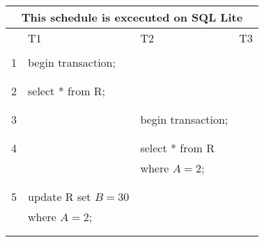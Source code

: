 \documentclass[addpoints,answers,12pt]{exam}
\begin{document}
\begin{questions}
\begin{parts}
\begin{subparts}
\hspace{-3cm}
\begin{tabular}{|c|l|l|l|} \hline
 \multicolumn{4}{|c|}{This schedule is excecuted on {\bf SQL Lite}} \\ \hline
   & \parbox{0.32\textwidth}{T1} & \parbox{0.32\textwidth}{T2} & \parbox{0.32\textwidth}{T3} \\ \hline
  &                                 &                    & \\
1 & begin transaction;              &                    & \\
  &                                 &                    & \\ \hline
  &                                 &                    & \\
2 & select * from R;                &                    & \\
  &                                 &                    & \\ \hline
  &                                 &                    & \\
3 &                                 & begin transaction; & \\
  &                                 &                    & \\ \hline
  &                                 &                    & \\
4 &                                 & select * from R    & \\
  &                                 & where $A=2$;       & \\
  &                                 &                    & \\ \hline
  &                                 &                    & \\
5 & update R set $B=30$             &                    & \\
  & where $A=2$;                    &                    & \\
  &                                 &                    & \\ \hline
  &                                 &                    & \\

\end{tabular}
\end{subparts}
\end{parts}
\end{questions}
\end{document}
